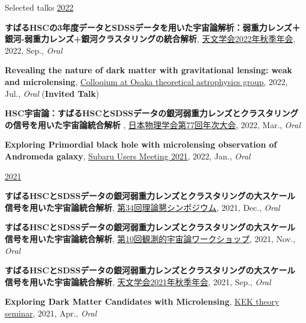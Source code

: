 \begin{rSection}{Selected talks}
\underline{2022}
\begin{etaremune}
\setcounter{enumi}{24}
\item \textbf{すばるHSCの3年度データとSDSSデータを用いた宇宙論解析：弱重力レンズ＋銀河-弱重力レンズ+銀河クラスタリングの統合解析}, \href{https://www.asj.or.jp/nenkai/archive/2022b/pdf/U15a.pdf}{天文学会2022年秋季年会}, 2022, Sep., \textit{Oral}
\item \textbf{Revealing the nature of dark matter with gravitational lensing: weak and microlensing}, \href{http://astro-osaka.jp/OUTAP/colloquium-abstracts.html#sugiyama}{Colloqium at Osaka theoretical astrophysics group}, 2022, Jul., \textit{Oral} (\textbf{Invited Talk})
\item \textbf{HSC宇宙論：すばるHSCとSDSSデータの銀河弱重力レンズとクラスタリングの信号を用いた宇宙論統合解析 }, \href{https://www.jps.or.jp/activities/meetings/annual/annual-index.php}{日本物理学会第77回年次大会}, 2022, Mar., \textit{Oral}
\item \textbf{Exploring Primordial black hole with microlensing observation of Andromeda galaxy}, \href{https://subarutelescope.org/Science/SubaruUM/SubaruUM2021/}{Subaru Users Meeting 2021}, 2022, Jan., \textit{Oral}
\end{etaremune}

\underline{2021}
\begin{etaremune}
\setcounter{enumi}{20}
\item \textbf{すばるHSCとSDSSデータの銀河弱重力レンズとクラスタリングの大スケール信号を用いた宇宙論統合解析}, \href{https://sites.google.com/view/rironkon2021/}{第34回理論懇シンポジウム}, 2021, Dec., \textit{Oral}
\item \textbf{すばるHSCとSDSSデータの銀河弱重力レンズとクラスタリングの大スケール信号を用いた宇宙論統合解析}, \href{https://sites.google.com/view/obscosmws2021main}{第10回観測的宇宙論ワークショップ}, 2021, Nov., \textit{Oral}
\item \textbf{すばるHSCとSDSSデータの銀河弱重力レンズとクラスタリングの大スケール信号を用いた宇宙論統合解析}, \href{https://www.asj.or.jp/nenkai/archive/2021b/pdf/U05a.pdf}{天文学会2021年秋季年会}, 2021, Sep., \textit{Oral}
\item \textbf{Exploring Dark Matter Candidates with Microlensing}, \href{https://www.kek.jp/ja/conference/20210407-3/}{KEK theory seminar}, 2021, Apr., \textit{Oral}
\end{etaremune}


\end{rSection}
